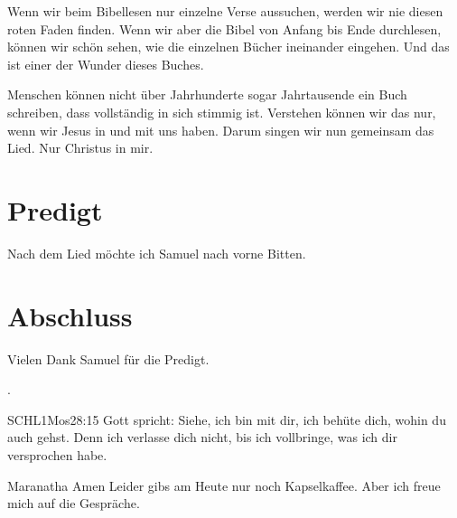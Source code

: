 \documentclass{../../inc/mybib}
\begin{document}
\begin{spacing}{1.5}
Wenn wir beim Bibellesen nur einzelne Verse aussuchen, werden wir nie diesen roten Faden finden. Wenn wir aber die Bibel von Anfang bis Ende durchlesen, können wir schön sehen, wie die einzelnen Bücher ineinander eingehen. Und das ist einer der Wunder dieses Buches.

Menschen können nicht über Jahrhunderte sogar Jahrtausende ein Buch schreiben, dass vollständig in sich stimmig ist. Verstehen können wir das nur, wenn wir Jesus in und mit uns haben. Darum singen wir nun gemeinsam das Lied. Nur Christus in mir.

\end{spacing}

\section{Predigt}
Nach dem Lied möchte ich Samuel nach vorne Bitten.





\section{Abschluss}
Vielen Dank Samuel für die Predigt.

.

\beten{}

\begin{bibelbox}{SCHL}{1Mos}{28:15}
    Gott spricht: Siehe, ich bin mit dir,
    ich behüte dich, wohin du auch gehst.
    Denn ich verlasse dich nicht,
    bis ich vollbringe, was ich dir versprochen habe.
\end{bibelbox}

Maranatha Amen
Leider gibs am Heute nur noch Kapselkaffee. Aber ich freue mich auf die Gespräche.
\end{document}
